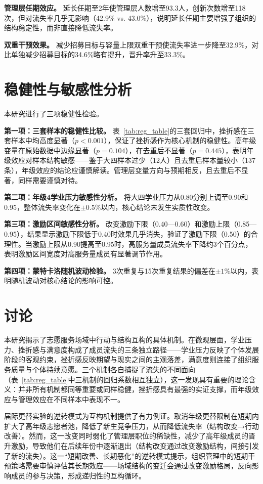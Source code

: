 \documentclass[12pt,a4paper]{article}
\begin{document}
\textbf{管理层任期效应。} 延长任期至2年使管理层人数增至93.3人，创新次数增至118次，但对流失率几乎无影响（42.9\% vs. 43.0\%），说明延长任期主要增强了组织的结构稳定性，而非直接降低流失率。

\textbf{双重干预效果。} 减少招募目标与容量上限双重干预使流失率进一步降至32.9\%，对比单独减少招募目标的34.6\%略有提升，晋升率升至33.3\%。

\section{稳健性与敏感性分析}

本研究进行了三项稳健性检验。

\textbf{第一项：三套样本的稳健性比较。} 表~\ref{tab:reg_table}的三套回归中，挫折感在三套样本中均高度显著（$p < 0.001$），保证了挫折感作为核心机制的稳健性。高年级变量在原始数据中边缘显著（$p=0.104$），在去重后不显著（$p=0.445$），表明年级效应对样本结构敏感——鉴于大四样本过少（12人）且去重后样本量较小（137条），年级效应的结论应谨慎解读。管理层变量方向与预期相反，且去重后不显著，同样需要谨慎对待。

\textbf{第二项：年级4学业压力敏感性分析。} 将大四学业压力从0.80分别上调至0.90和0.95，整体流失率变化在$\pm 0.5\%$以内，核心结论未发生实质性改变。

\textbf{第三项：激励区间敏感性分析。} 改变激励下限（0.40—0.60）和激励上限（0.85—0.95），结果显示激励下限低于0.40时效果几乎消失，验证了激励下限（0.50）的合理性。当激励上限从0.90提高至0.95时，高服务量成员流失率下降约3个百分点，表明激励区间宽度对高服务量成员有显著调节作用。

\textbf{第四项：蒙特卡洛随机波动检验。} 3次重复与15次重复结果的偏差在$\pm 1\%$以内，表明随机波动对核心结论的影响可控。

\section{讨论}

本研究揭示了志愿服务场域中行动与结构互构的具体机制。在微观层面，学业压力、挫折感与满意度构成了成员流失的三条独立路径——学业压力反映了个体发展阶段的客观约束，挫折感反映期望与现实之间的主观落差，满意度则连接了组织服务质量与个体持续意愿。三个机制各自捕捉了流失的不同面向（表~\ref{tab:reg_table}中三机制的回归系数相互独立），这一发现具有重要的理论含义：并非所有机制都同等重要或同样稳健，挫折感具有最强的实证支撑，而年级效应与管理效应在不同样本中表现不一。

届际更替实验的逆转模式为互构机制提供了有力例证。取消年级更替限制在短期内扩大了高年级志愿者池，降低了新生竞争压力，从而降低流失率（结构改变→行动改善）。然而，这一改变同时弱化了管理层职位的稀缺性，减少了高年级成员的晋升激励，导致他们在后续年份中逐渐退出（结构改变通过改变激励结构，间接引发了新的流失）。这一“短期改善、长期恶化”的逆转模式提示，组织管理中的短期干预策略需要审慎评估其长期效应——场域结构的变迁会通过改变激励格局，反向影响成员的参与决策，形成递归性的互构循环。
\end{document}
